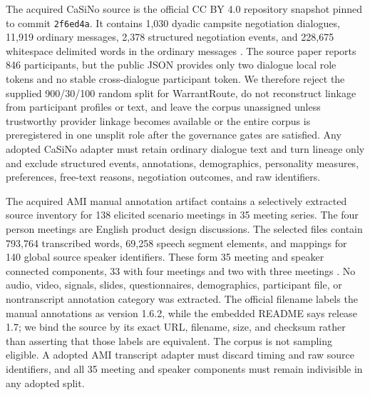 The acquired CaSiNo source is the official CC BY 4.0 repository snapshot
pinned to commit \texttt{2f6ed4a}. It contains 1,030 dyadic campsite
negotiation dialogues, 11,919 ordinary messages, 2,378 structured negotiation
events, and 228,675 whitespace delimited words in the ordinary messages
\citep{chawla2021casino}. The source paper reports 846 participants, but the
public JSON provides only two dialogue local role tokens and no stable
cross-dialogue participant token. We therefore reject the supplied 900/30/100
random split for WarrantRoute, do not reconstruct linkage from participant
profiles or text, and leave the corpus unassigned unless trustworthy provider
linkage becomes available or the entire corpus is preregistered in one unsplit
role after the governance gates are satisfied. Any adopted CaSiNo adapter must
retain ordinary dialogue text and turn lineage only and exclude structured
events, annotations, demographics, personality measures, preferences, free-text
reasons, negotiation outcomes, and raw identifiers.

The acquired AMI manual annotation artifact contains a selectively extracted
source inventory for 138 elicited scenario meetings in 35 meeting series. The
four person meetings are English product design discussions. The selected
files contain 793,764 transcribed words, 69,258 speech segment
elements, and mappings for 140 global source speaker identifiers. These form
35 meeting and speaker connected components, 33 with four meetings and two
with three meetings \citep{carletta2006ami}. No audio, video, signals, slides,
questionnaires, demographics, participant file, or nontranscript annotation
category was extracted. The official filename labels the manual annotations
as version 1.6.2, while the embedded README says release 1.7; we bind the
source by its exact URL, filename, size, and checksum rather than asserting
that those labels are equivalent. The corpus is not sampling eligible. A
adopted AMI transcript adapter must discard timing and raw source identifiers, and
all 35 meeting and speaker components must remain indivisible in any adopted
split.

